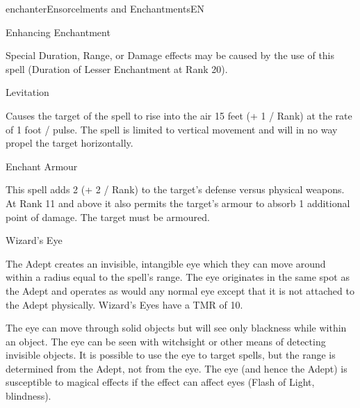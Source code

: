 \begin{college}[1.1]{enchanter}{Ensorcelments and Enchantments}{EN}
\begin{spell}[S-7]{Enhancing Enchantment}
\begin{effects}
Special Duration, Range, or Damage effects may be caused by the use of
this spell (\eg Duration of Lesser Enchantment at Rank 20).

\end{effects}
\end{spell}

\begin{spell}[S-8]{Levitation}

\begin{effects}
Causes the target of the spell to rise into the air 15 feet (+ 1 /
Rank) at the rate of 1 foot / pulse. The spell is limited to vertical
movement and will in no way propel the target horizontally.

\end{effects}
\end{spell}

\begin{spell}[S-9]{Enchant Armour}

\begin{effects}
This spell adds 2 (+ 2 / Rank) to the target's defense versus physical
weapons.  At Rank 11 and above it also permits the target's armour to
absorb 1 additional point of damage. The target must be armoured.
\end{effects}
\end{spell}

\begin{spell}[S-10]{Wizard's Eye}

\begin{effects}
The Adept creates an invisible, intangible eye which they can move
around within a radius equal to the spell's range. The eye originates
in the same spot as the Adept and operates as would any normal eye
except that it is not attached to the Adept physically.  Wizard's Eyes
have a TMR of 10.

The eye can move through solid objects but will see only blackness
while within an object.  The eye can be seen with witchsight or other
means of detecting invisible objects.  It is possible to use the eye
to target spells, but the range is determined from the Adept, not from
the eye.  The eye (and hence the Adept) is susceptible to magical
effects if the effect can affect eyes (\eg Flash of Light,
blindness).
\end{effects}
\end{spell}


\end{college}
